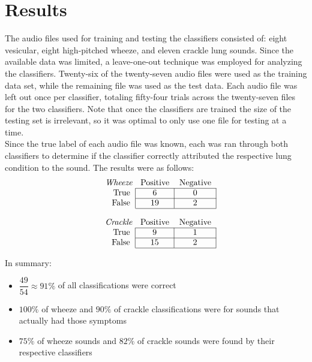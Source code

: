 \documentclass{article}
\begin{document}
\section{Results}

The audio files used for training and testing the classifiers consisted of: eight vesicular, eight high-pitched wheeze, and eleven crackle lung sounds. Since the available data was limited, a leave-one-out technique was employed for analyzing the classifiers. Twenty-six of the twenty-seven audio files were used as the training data set, while the remaining file was used as the test data. Each audio file was left out once per classifier, totaling fifty-four trials across the twenty-seven files for the two classifiers. Note that once the classifiers are trained the size of the testing set is irrelevant, so it was optimal to only use one file for testing at a time.\\

Since the true label of each audio file was known, each was ran through both classifiers to determine if the classifier correctly attributed the respective lung condition to the sound. The results were as follows:\\


\begin{align*}
\begin{tabular}{ r|c|c| }
\multicolumn{1}{r}{}
 \emph{Wheeze} & \multicolumn{1}{c}{Positive}
 & \multicolumn{1}{c}{Negative} \\
\cline{2-3}
True & 6 & 0 \\
\cline{2-3}
False & 19 & 2 \\
\cline{2-3}
\end{tabular}
\end{align*}

\begin{align*}
\begin{tabular}{ r|c|c| }
\multicolumn{1}{r}{}
 \emph{Crackle} & \multicolumn{1}{c}{Positive}
 & \multicolumn{1}{c}{Negative} \\
\cline{2-3}
True & 9 & 1 \\
\cline{2-3}
False & 15 & 2 \\
\cline{2-3}
\end{tabular}
\end{align*}

In summary:
\begin{itemize}
\item
	$\dfrac{49}{54}\approx 91\%$ of all classifications were correct
\item
	$100\%$ of wheeze and $90\%$ of crackle classifications were for sounds that actually had those symptoms
\item
	$75\%$ of wheeze sounds and $82\%$ of crackle sounds were found by their respective classifiers
\end{itemize}
\end{document}
